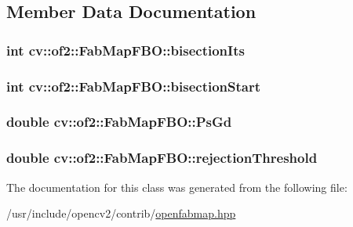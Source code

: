 \subsection{Member Data Documentation}
\hypertarget{classcv_1_1of2_1_1FabMapFBO_a6ef71a3e6b08b508bca8e9922a20fd14}{
\subsubsection[{bisection\-Its}]{\setlength{\rightskip}{0pt plus 5cm}int cv\-::of2\-::\-Fab\-Map\-F\-B\-O\-::bisection\-Its\hspace{0.3cm}{\ttfamily [protected]}}}\label{classcv_1_1of2_1_1FabMapFBO_a6ef71a3e6b08b508bca8e9922a20fd14}
\hypertarget{classcv_1_1of2_1_1FabMapFBO_ad08624a1ba605321178bc0a2bc1a4f22}{
\subsubsection[{bisection\-Start}]{\setlength{\rightskip}{0pt plus 5cm}int cv\-::of2\-::\-Fab\-Map\-F\-B\-O\-::bisection\-Start\hspace{0.3cm}{\ttfamily [protected]}}}\label{classcv_1_1of2_1_1FabMapFBO_ad08624a1ba605321178bc0a2bc1a4f22}
\hypertarget{classcv_1_1of2_1_1FabMapFBO_a6d86ee7a5e3e7cc053154d0754b45053}{
\subsubsection[{Ps\-Gd}]{\setlength{\rightskip}{0pt plus 5cm}double cv\-::of2\-::\-Fab\-Map\-F\-B\-O\-::\-Ps\-Gd\hspace{0.3cm}{\ttfamily [protected]}}}\label{classcv_1_1of2_1_1FabMapFBO_a6d86ee7a5e3e7cc053154d0754b45053}
\hypertarget{classcv_1_1of2_1_1FabMapFBO_a32ad6da8dc902456924684f3892d1332}{
\subsubsection[{rejection\-Threshold}]{\setlength{\rightskip}{0pt plus 5cm}double cv\-::of2\-::\-Fab\-Map\-F\-B\-O\-::rejection\-Threshold\hspace{0.3cm}{\ttfamily [protected]}}}\label{classcv_1_1of2_1_1FabMapFBO_a32ad6da8dc902456924684f3892d1332}


The documentation for this class was generated from the following file\-:\begin{DoxyCompactItemize}
\item 
/usr/include/opencv2/contrib/\hyperlink{openfabmap_8hpp}{openfabmap.\-hpp}\end{DoxyCompactItemize}
